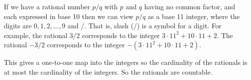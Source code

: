 \documentclass[12pt]{article}
\begin{document}
If we have a rational number $p/q$ with $p$ and $q$ having no common factor,
and each expressed in base 10 then we can view  $p/q$ as a base 11 integer,
where the digits are $0,1,2,\ldots,9$ and $/$. That is, slash ($/$) is a symbol for a
digit. For example, the rational 3/2 corresponds to the integer $3\cdot 11^2 + 10\cdot 11 + 2$.
The rational $-3/2$ corresponds to the integer $-(3\cdot 11^2 + 10 \cdot 11 + 2)$.

This gives a one-to-one map into the 
integers so the cardinality of the rationals is at most the cardinality of
the integers. So the rationals are countable. 
\end{document}

